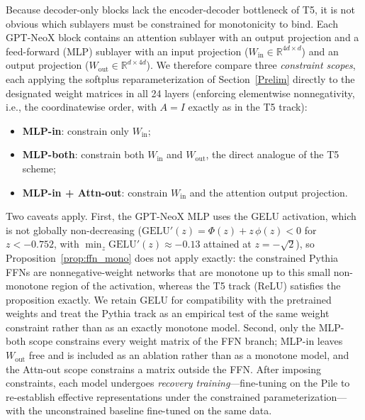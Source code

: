 \documentclass{article}
\theoremstyle{plain}
\theoremstyle{definition}
\theoremstyle{remark}
\begin{document}
Because decoder-only blocks lack the encoder-decoder bottleneck of T5, it is not obvious which sublayers must be constrained for monotonicity to bind. Each GPT-NeoX block contains an attention sublayer with an output projection and a feed-forward (MLP) sublayer with an input projection ($W_{\mathrm{in}} \in \mathbb{R}^{4d \times d}$) and an output projection ($W_{\mathrm{out}} \in \mathbb{R}^{d \times 4d}$). We therefore compare three \emph{constraint scopes}, each applying the softplus reparameterization of Section~\ref{Prelim} directly to the designated weight matrices in all 24 layers (enforcing elementwise nonnegativity, i.e., the coordinatewise order, with $A = I$ exactly as in the T5 track):
\begin{itemize}
    \item \textbf{MLP-in}: constrain only $W_{\mathrm{in}}$;
    \item \textbf{MLP-both}: constrain both $W_{\mathrm{in}}$ and $W_{\mathrm{out}}$, the direct analogue of the T5 scheme;
    \item \textbf{MLP-in + Attn-out}: constrain $W_{\mathrm{in}}$ and the attention output projection.
\end{itemize}
Two caveats apply. First, the GPT-NeoX MLP uses the GELU activation, which is not globally non-decreasing ($\mathrm{GELU}'(z) = \Phi(z) + z\,\phi(z) < 0$ for $z < -0.752$, with $\min_z \mathrm{GELU}'(z) \approx -0.13$ attained at $z = -\sqrt{2}$), so Proposition~\ref{prop:ffn_mono} does not apply exactly: the constrained Pythia FFNs are nonnegative-weight networks that are monotone up to this small non-monotone region of the activation, whereas the T5 track (ReLU) satisfies the proposition exactly. We retain GELU for compatibility with the pretrained weights and treat the Pythia track as an empirical test of the same weight constraint rather than as an exactly monotone model. Second, only the MLP-both scope constrains every weight matrix of the FFN branch; MLP-in leaves $W_{\mathrm{out}}$ free and is included as an ablation rather than as a monotone model, and the Attn-out scope constrains a matrix outside the FFN.
After imposing constraints, each model undergoes \emph{recovery training}---fine-tuning on the Pile to re-establish effective representations under the constrained parameterization---with the unconstrained baseline fine-tuned on the same data. %
\end{document}
